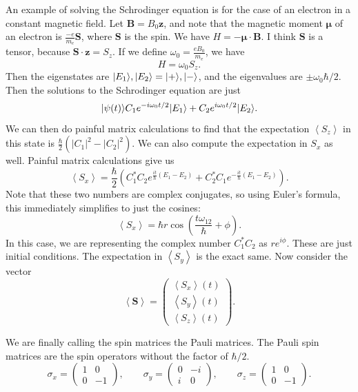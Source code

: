 
An example of solving the Schrodinger equation is for the case of an electron in a constant magnetic field. Let $\mathbf{B} =B_0 \mathbf{z} $, and note that the magnetic moment $\boldsymbol{\mu} $ of an electron is $\frac{-e}{m_e} \mathbf{S} $, where $\mathbf{S} $ is the spin. We have $H=-\boldsymbol{\mu} \cdot \mathbf{B} $. I think $\mathbf{S} $ is a tensor, because $\mathbf{S} \cdot \mathbf{z} =S_z$. If we define $\omega_0 = \frac{eB_0}{m_e} $, we have
\[
	H=\omega_0 S_z
.\]
Then the eigenstates are $\lvert E_1\rangle ,\lvert E_2\rangle =\lvert+\rangle ,\lvert-\rangle $, and the eigenvalues are $\pm \omega_0 \hbar /2$. Then the solutions to the Schrodinger equation are just
\[
	\lvert\psi (t)\rangle C_1 e^{-i\omega_0 t/2} \lvert E_1\rangle +C_2 e^{i\omega_0 t/2} \lvert E_2\rangle 
.\]
We can then do painful matrix calculations to find that the expectation $\left\langle S_z \right\rangle $ in this state is $\frac{\hbar }{2} \left( \left| C_1 \right| ^2-\left| C_2 \right| ^2 \right) $. We can also compute the expectation in $S_x$ as well. Painful matrix calculations give us
\[
	\left\langle S_x \right\rangle =\frac{\hbar }{2} \left( C_1^* C_2 e^{\frac{it}{\hbar } (E_1-E_2)} +C_2^*C_1e^{-\frac{it}{\hbar } (E_1-E_2)} \right) 
.\]
Note that these two numbers are complex conjugates, so using Euler's formula, this immediately simplifies to just the cosines:
\[
	\left\langle S_x \right\rangle =\hbar r\cos \left( \frac{t\omega_{12} }{\hbar } +\phi  \right) 
.\]
In this case, we are representing the complex number $C_1^*C_2$ as $re^{i\phi } $. These are just initial conditions. The expectation in $\left\langle S_y \right\rangle $ is the exact same. Now consider the vector
\[
	\left<\mathbf{S}\right> =\begin{pmatrix}
	\left\langle S_x \right\rangle (t) \\
	\left\langle S_y \right\rangle (t) \\
	\left\langle S_z \right\rangle (t)
	\end{pmatrix}
.\]

\begin{remark}
	We are finally calling the spin matrices the Pauli matrices. The Pauli spin matrices are the spin operators without the factor of $\hbar /2$.
	\[
		\sigma_x = \begin{pmatrix}
		1 & 0 \\
		0 & -1
		\end{pmatrix},\qquad \sigma_y = \begin{pmatrix}
		0 & -i \\
		i & 0
		\end{pmatrix},\qquad \sigma_z = \begin{pmatrix}
		1 & 0 \\
		0 & -1
		\end{pmatrix}
	.\]
\end{remark}

